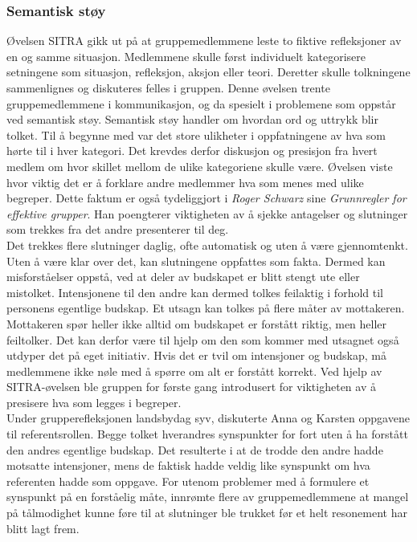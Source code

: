\subsubsection{Semantisk støy}

Øvelsen SITRA gikk ut på at gruppemedlemmene leste to fiktive refleksjoner av en og samme situasjon.
Medlemmene skulle først individuelt kategorisere setningene som situasjon, refleksjon, aksjon eller teori.
Deretter skulle tolkningene sammenlignes og diskuteres felles i gruppen.
Denne øvelsen trente gruppemedlemmene i kommunikasjon, og da spesielt i problemene som oppstår ved semantisk støy.
Semantisk støy handler om hvordan ord og uttrykk blir tolket.
Til å begynne med var det store ulikheter i oppfatningene av hva som hørte til i hver kategori.
Det krevdes derfor diskusjon og presisjon fra hvert medlem om hvor skillet mellom de ulike kategoriene skulle være.
Øvelsen viste hvor viktig det er å forklare andre medlemmer hva som menes med ulike begreper. 
Dette faktum er også tydeliggjort i \textit{Roger Schwarz} sine \textit{Grunnregler for effektive grupper}\cite{schwarz}. 
Han poengterer viktigheten av å sjekke antagelser og slutninger som trekkes fra det andre presenterer til deg.
\\
Det trekkes flere slutninger daglig, ofte automatisk og uten å være gjennomtenkt. 
Uten å være klar over det, kan slutningene oppfattes som fakta.
Dermed kan misforståelser oppstå, ved at deler av budskapet er blitt stengt ute eller mistolket.
Intensjonene til den andre kan dermed tolkes feilaktig i forhold til personens egentlige budskap.
Et utsagn kan tolkes på flere måter av mottakeren.
Mottakeren spør heller ikke alltid om budskapet er forstått riktig, men heller feiltolker.
Det kan derfor være til hjelp om den som kommer med utsagnet også utdyper det på eget initiativ.
Hvis det er tvil om intensjoner og budskap, må medlemmene ikke nøle med å spørre om alt er forstått korrekt.
Ved hjelp av SITRA-øvelsen ble gruppen for første gang introdusert for viktigheten av å presisere hva som legges i begreper.
\\
Under grupperefleksjonen landsbydag syv, diskuterte Anna og Karsten oppgavene til referentsrollen.
Begge tolket hverandres synspunkter for fort uten å ha forstått den andres egentlige budskap.
Det resulterte i at de trodde den andre hadde motsatte intensjoner, mens de faktisk hadde veldig like synspunkt om hva referenten hadde som oppgave. 
For utenom problemer med å formulere et synspunkt på en forståelig måte, innrømte flere av gruppemedlemmene at mangel på tålmodighet kunne føre til at slutninger ble trukket før et helt resonement har blitt lagt frem. 
